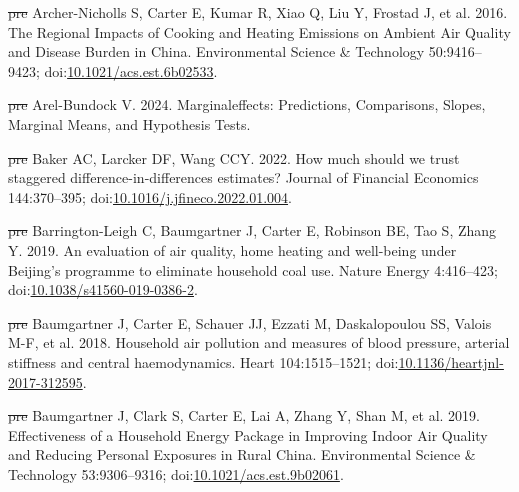 \documentclass[
  letterpaper,
  DIV=11,
  numbers=noendperiod]{scrartcl}
\newlength{\cslhangindent}
\newenvironment{CSLReferences}[2] %
 {\begin{list}{}{%
  \setlength{\itemindent}{0pt} %
  \setlength{\leftmargin}{0pt} %
  \setlength{\parsep}{0pt} %
  \ifodd #1
   \setlength{\leftmargin}{\cslhangindent} %
   \setlength{\itemindent}{-1\cslhangindent} %
  \fi
  \setlength{\itemsep}{#2\baselineskip}}} %
 {\end{list}} %
\providecommand{\DIFdel}[1]{{\protect\color{red}\sout{#1}}}                      %
\providecommand{\DIFaddbegin}{} %
\providecommand{\DIFaddend}{} %
\providecommand{\DIFdelbegin}{} %
\providecommand{\DIFdelend}{} %
\newcommand{\DIFscaledelfig}{0.5}
\newlength{\DIFdelgraphicswidth} %
\newlength{\DIFdelgraphicsheight} %
\newcommand{\DIFaddincludegraphics}[2][]{{\color{blue}\fbox{\DIFOincludegraphics[#1]{#2}}}} %
\newcommand{\DIFdelincludegraphics}[2][]{%
\sbox{\DIFdelgraphicsbox}{\DIFOincludegraphics[#1]{#2}}%
\settoboxwidth{\DIFdelgraphicswidth}{\DIFdelgraphicsbox} %
\settoboxtotalheight{\DIFdelgraphicsheight}{\DIFdelgraphicsbox} %
\scalebox{\DIFscaledelfig}{%
\parbox[b]{\DIFdelgraphicswidth}{\usebox{\DIFdelgraphicsbox}\\[-\baselineskip] \rule{\DIFdelgraphicswidth}{0em}}\llap{\resizebox{\DIFdelgraphicswidth}{\DIFdelgraphicsheight}{%
\setlength{\unitlength}{\DIFdelgraphicswidth}%
\begin{picture}(1,1)%
\thicklines\linethickness{2pt} %
{\color[rgb]{1,0,0}\put(0,0){\framebox(1,1){}}}%
{\color[rgb]{1,0,0}\put(0,0){\line( 1,1){1}}}%
{\color[rgb]{1,0,0}\put(0,1){\line(1,-1){1}}}%
\end{picture}%
}\hspace*{3pt}}} %
} %
\DeclareRobustCommand{\DIFaddbegin}{\DIFOaddbegin \let\includegraphics\DIFaddincludegraphics} %
\DeclareRobustCommand{\DIFaddend}{\DIFOaddend \let\includegraphics\DIFOincludegraphics} %
\DeclareRobustCommand{\DIFdelbegin}{\DIFOdelbegin \let\includegraphics\DIFdelincludegraphics} %
\DeclareRobustCommand{\DIFdelend}{\DIFOaddend \let\includegraphics\DIFOincludegraphics} %
\begin{document}
\begin{CSLReferences}{1}{1}
\DIFdelbegin %
\DIFdel{pre}%
\DIFdelend \DIFaddbegin {}
\DIFaddend Archer-Nicholls S, Carter E, Kumar R, Xiao Q, Liu Y, Frostad J, et al.
2016. The {Regional Impacts} of {Cooking} and {Heating Emissions} on
{Ambient Air Quality} and {Disease Burden} in {China}. Environmental
Science \& Technology 50:9416--9423;
doi:\href{https://doi.org/10.1021/acs.est.6b02533}{10.1021/acs.est.6b02533}.

\DIFdelbegin %
\DIFdel{pre}%
\DIFdelend \DIFaddbegin {}
\DIFaddend Arel-Bundock V. 2024. Marginaleffects: {Predictions}, {Comparisons},
{Slopes}, {Marginal Means}, and {Hypothesis Tests}.

\DIFdelbegin %
\DIFdel{pre}%
\DIFdelend \DIFaddbegin {}
\DIFaddend Baker AC, Larcker DF, Wang CCY. 2022. How much should we trust staggered
difference-in-differences estimates? Journal of Financial Economics
144:370--395;
doi:\href{https://doi.org/10.1016/j.jfineco.2022.01.004}{10.1016/j.jfineco.2022.01.004}.

\DIFdelbegin %
\DIFdel{pre}%
\DIFdelend \DIFaddbegin {}
\DIFaddend Barrington-Leigh C, Baumgartner J, Carter E, Robinson BE, Tao S, Zhang
Y. 2019. An evaluation of air quality, home heating and well-being under
{Beijing}'s programme to eliminate household coal use. Nature Energy
4:416--423;
doi:\href{https://doi.org/10.1038/s41560-019-0386-2}{10.1038/s41560-019-0386-2}.

\DIFdelbegin %
\DIFdel{pre}%
\DIFdelend \DIFaddbegin {}
\DIFaddend Baumgartner J, Carter E, Schauer JJ, Ezzati M, Daskalopoulou SS, Valois
M-F, et al. 2018. Household air pollution and measures of blood
pressure, arterial stiffness and central haemodynamics. Heart
104:1515--1521;
doi:\href{https://doi.org/10.1136/heartjnl-2017-312595}{10.1136/heartjnl-2017-312595}.

\DIFdelbegin %
\DIFdel{pre}%
\DIFdelend \DIFaddbegin {}
\DIFaddend Baumgartner J, Clark S, Carter E, Lai A, Zhang Y, Shan M, et al. 2019.
Effectiveness of a {Household Energy Package} in {Improving Indoor Air
Quality} and {Reducing Personal Exposures} in {Rural China}.
Environmental Science \& Technology 53:9306--9316;
doi:\href{https://doi.org/10.1021/acs.est.9b02061}{10.1021/acs.est.9b02061}.


\end{CSLReferences}
\end{document}
